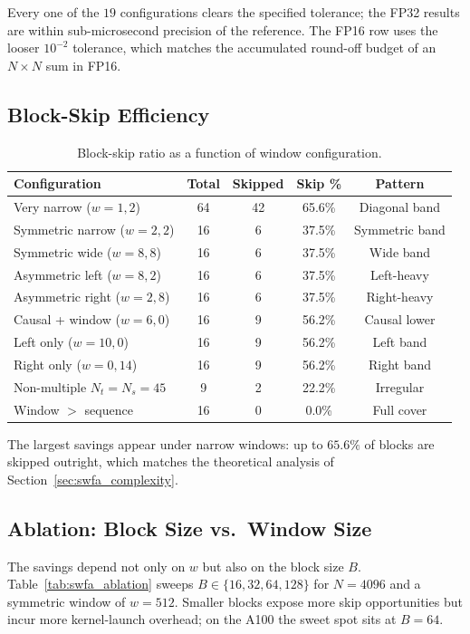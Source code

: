 Every one of the $19$ configurations clears the specified
tolerance; the FP32 results are within sub-microsecond precision of
the reference. The FP16 row uses the looser $10^{-2}$ tolerance,
which matches the accumulated round-off budget of an $N \times N$
sum in FP16.

\subsection{Block-Skip Efficiency}\label{sec:swfa_blocks}
\begin{table}[h]
\centering
\caption{Block-skip ratio as a function of window configuration.}
\label{tab:swfa_efficiency}
\begin{tabular}{lcccc}
\toprule
\textbf{Configuration}       & \textbf{Total} & \textbf{Skipped} & \textbf{Skip \%} & \textbf{Pattern} \\
\midrule
Very narrow ($w{=}1,2$)      & 64 & 42 & 65.6\% & Diagonal band \\
Symmetric narrow ($w{=}2,2$) & 16 &  6 & 37.5\% & Symmetric band \\
Symmetric wide ($w{=}8,8$)   & 16 &  6 & 37.5\% & Wide band \\
Asymmetric left ($w{=}8,2$)  & 16 &  6 & 37.5\% & Left-heavy \\
Asymmetric right ($w{=}2,8$) & 16 &  6 & 37.5\% & Right-heavy \\
Causal + window ($w{=}6,0$)  & 16 &  9 & 56.2\% & Causal lower \\
Left only ($w{=}10,0$)       & 16 &  9 & 56.2\% & Left band \\
Right only ($w{=}0,14$)      & 16 &  9 & 56.2\% & Right band \\
Non-multiple $N_t = N_s=45$  &  9 &  2 & 22.2\% & Irregular \\
Window $>$ sequence          & 16 &  0 &  0.0\% & Full cover \\
\bottomrule
\end{tabular}
\end{table}

The largest savings appear under narrow windows: up to $65.6\%$ of
blocks are skipped outright, which matches the theoretical analysis
of Section~\ref{sec:swfa_complexity}.

\subsection{Ablation: Block Size vs.\ Window Size}\label{sec:swfa_ablation}
The savings depend not only on $w$ but also on the block size $B$.
Table~\ref{tab:swfa_ablation} sweeps $B \in \{16, 32, 64, 128\}$
for $N = 4096$ and a symmetric window of $w = 512$. Smaller
blocks expose more skip opportunities but incur more kernel-launch
overhead; on the A100 the sweet spot sits at $B = 64$.

